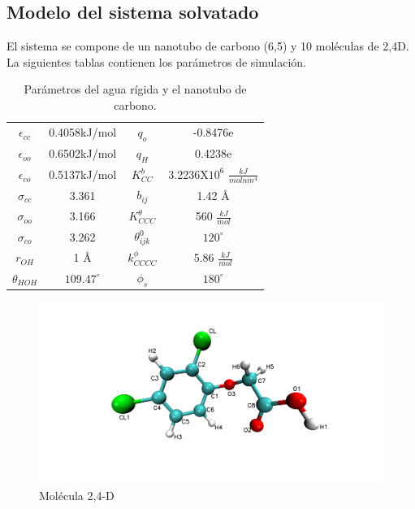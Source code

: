 \newpage

\subsection{Modelo del sistema solvatado}

El sistema se compone de un nanotubo de carbono (6,5) y 10 moléculas de 2,4D. La siguientes tablas contienen los parámetros de simulación.

\begin{table}[!h]
    \centering
    \begin{tabular}{|c|c|c|c|}
    \hline
    $\epsilon_{cc}$ & 0.4058kJ/mol & $q_{o}$   & -0.8476e \\
    $\epsilon_{oo}$ & 0.6502kJ/mol &  $q_H$    & 0.4238e \\
    $\epsilon_{co}$ & 0.5137kJ/mol & $K^b_{CC}$& 3.2236X$10^6$ $\frac{kJ}{molnm^4}$\\
    $\sigma_{cc}$   & 3.361        & $b_{ij}$  & 1.42 \AA\\
    $\sigma_{oo}$   & 3.166        & $K^{\theta}_{CCC}$& 560 $\frac{kJ}{mol}$ \\
    $\sigma_{co}$   & 3.262        & $\theta^0_{ijk}$  & $120^{\circ}$ \\
    $r_{OH}$        & 1 \AA        & $k^{\phi}_{CCCC}$ & 5.86 $\frac{kJ}{mol}$ \\
    $\theta_{HOH}$  & $109.47^{\circ}$ & $\phi_s$         & $180^{\circ}$ \\
    \hline
    \end{tabular}
    \caption{Parámetros del agua rígida y el nanotubo de carbono. \cite{meng2008}}
    \label{tab:cnth2oparameters}
\end{table}

\begin{figure}[!h]
    \centering
    \includegraphics[width=.9\textwidth,keepaspectratio=true]{figura_nueva_tarea.png}
    \caption{Molécula 2,4-D}
    \label{fig:24Dfigure}
\end{figure}

